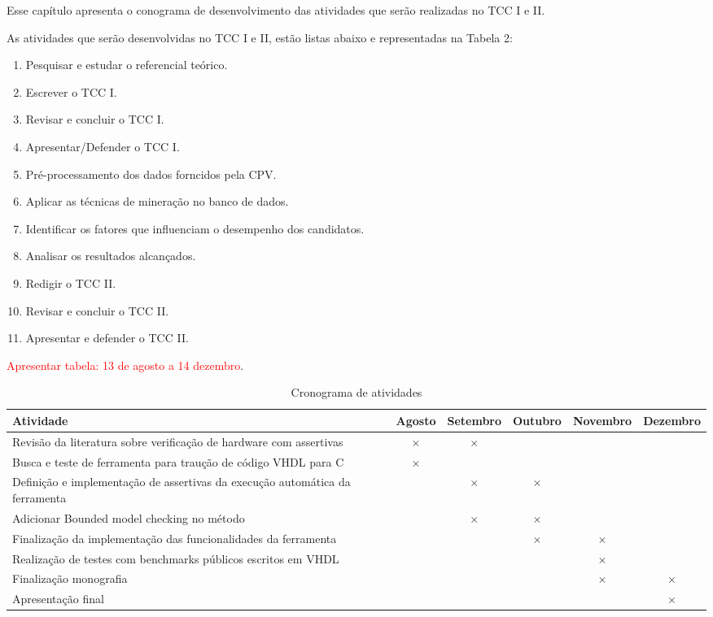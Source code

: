 \label{chapter:cronograma}

\par
Esse capítulo apresenta o conograma de desenvolvimento das atividades que serão realizadas no TCC I e II.

As atividades que serão desenvolvidas no TCC I e II, estão listas abaixo e representadas na Tabela 2:

\begin{enumerate}
  \item Pesquisar e estudar o referencial teórico.    
  \item Escrever o TCC I.
  \item Revisar e concluir o TCC I.
  \item Apresentar/Defender o TCC I.
  \item Pré-processamento dos dados forncidos pela CPV.
  \item Aplicar as técnicas de mineração no banco de dados.
  \item Identificar os fatores que influenciam o desempenho dos candidatos.
  \item Analisar os resultados alcançados. 
  \item Redigir o TCC II.
  \item Revisar e concluir o TCC II.
  \item Apresentar e defender o TCC II.
\end{enumerate}

\textcolor{red}{Apresentar tabela: 13 de agosto a 14 dezembro}.
\label{chapter:cronograma}
\begin{table}[htbp]
  \centering
  \caption{Cronograma de atividades}
  \label{tab:cronograma}
  \begin{tabularx}{\textwidth}{|X|c|c|c|c|c|}
    \hline
    \textbf{Atividade} & \textbf{Agosto} & \textbf{Setembro} & \textbf{Outubro} & \textbf{Novembro} & \textbf{Dezembro} \\
    \hline
    Revisão da literatura sobre verificação de hardware com assertivas & \(\times\) & \(\times\) & & & \\
    \hline
    Busca e teste de ferramenta para traução de código VHDL para C & \(\times\) & & & & \\
    \hline
    Definição e implementação de assertivas da execução automática da ferramenta & & \(\times\) & \(\times\) & & \\
    \hline
    Adicionar Bounded model checking no método & & \(\times\) & \(\times\) & &  \\
    \hline
    Finalização da implementação das funcionalidades da ferramenta & & & \(\times\) & \(\times\) &  \\
    \hline
    Realização de testes com benchmarks públicos escritos em VHDL & & &  & \(\times\) & \\
    \hline
    Finalização monografia & & & & \(\times\) & \(\times\) \\
    \hline
    Apresentação final & & & &  & \(\times\) \\
    \hline
  \end{tabularx}
\end{table}